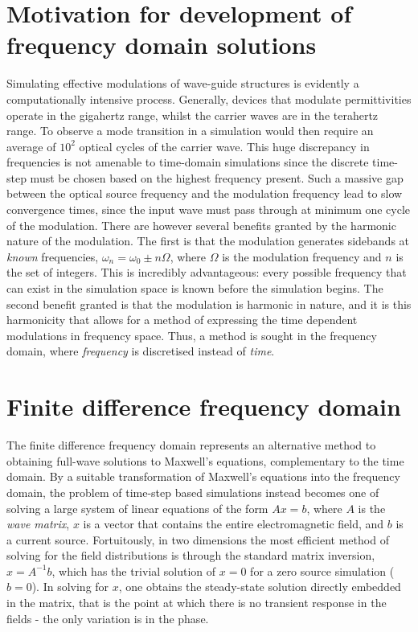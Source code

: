 \section{Motivation for development of frequency domain solutions}

Simulating effective modulations of wave-guide structures is evidently a computationally intensive process. Generally, devices that modulate permittivities operate in the gigahertz range, whilst the carrier waves are in the terahertz range. To observe a mode transition in a simulation would then require an average of $10^2$ optical cycles of the carrier wave. This huge discrepancy in frequencies is not amenable to time-domain simulations since the discrete time-step must be chosen based on the highest frequency present. Such a massive gap between the optical source frequency and the modulation frequency lead to slow convergence times, since the input wave must pass through at minimum one cycle of the modulation. There are however several benefits granted by the harmonic nature of the modulation. The first is that the modulation generates sidebands at \textit{known} frequencies, $\omega_n = \omega_0 \pm n \Omega$, where $\Omega$ is the modulation frequency and $n$ is the set of integers. This is incredibly advantageous: every possible frequency that can exist in the simulation space is known before the simulation begins. The second benefit granted is that the modulation is harmonic in nature, and it is this harmonicity that allows for a method of expressing the time dependent modulations in frequency space. Thus, a method is sought in the frequency domain, where \textit{frequency} is discretised instead of \textit{time}.


\section{Finite difference frequency domain}

The finite difference frequency domain represents an alternative method to obtaining full-wave solutions to Maxwell's equations, complementary to the time domain. By a suitable transformation of Maxwell's equations into the frequency domain, the problem of time-step based simulations instead becomes one of solving a large system of linear equations of the form $Ax=b$, where $A$ is the \textit{wave matrix}, $x$ is a vector that contains the entire electromagnetic field, and $b$ is a current source. Fortuitously, in two dimensions the most efficient method of solving for the field distributions is through the standard matrix inversion, $x = A^{-1}b$, which has the trivial solution of $x=0$ for a zero source simulation ($b=0$). In solving for $x$, one obtains the steady-state solution directly embedded in the matrix, that is the point at which there is no transient response in the fields - the only variation is in the phase.

